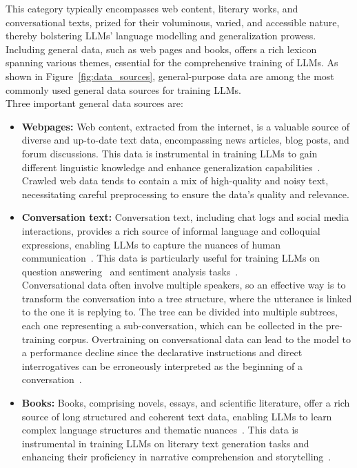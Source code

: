 This category typically encompasses web content, literary works, and conversational texts, prized for their voluminous, varied, and accessible nature, thereby bolstering LLMs' language modelling and generalization prowess.
Including general data, such as web pages and books, offers a rich lexicon spanning various themes, essential for the comprehensive training of LLMs.
As shown in Figure~\ref{fig:data_sources}, general-purpose data are among the most commonly used general data sources for training LLMs.\\
Three important general data sources are:
\begin{itemize}
	\item \textbf{Webpages:} {Web content, extracted from the internet, is a valuable source of diverse and up-to-date text data, encompassing news articles, blog posts, and forum discussions. This data is instrumental in training LLMs to gain different linguistic knowledge and enhance generalization capabilities~\cite{brown2020language, raffel2023exploring}.
		      Crawled web data tends to contain a mix of high-quality and noisy text, necessitating careful preprocessing to ensure the data's quality and relevance.
	      }
	\item \textbf{Conversation text:} {
		      Conversation text, including chat logs and social media interactions, provides a rich source of informal language and colloquial expressions, enabling LLMs to capture the nuances of human communication~\cite{zhang2022opt}. This data is particularly useful for training LLMs on question answering~\cite{chowdhery2022palm} and sentiment analysis tasks~\cite{zellers2019defending}.\\
		      Conversational data often involve multiple speakers, so an effective way is to transform the conversation into a tree structure, where the utterance is linked to the one it is replying to. The tree can be divided into multiple subtrees, each one representing a sub-conversation, which can be collected in the pre-training corpus.
		      Overtraining on conversational data can lead to the model to a performance decline since the declarative instructions and direct interrogatives can be erroneously interpreted as the beginning of a conversation~\cite{zhang2022opt}.
	      }
	\item \textbf{Books:} {
		      Books, comprising novels, essays, and scientific literature, offer a rich source of long structured and coherent text data, enabling LLMs to learn complex language structures and thematic nuances~\cite{zhu2015aligning}. This data is instrumental in training LLMs on literary text generation tasks and enhancing their proficiency in narrative comprehension and storytelling~\cite{radford2019language}.
	      }
\end{itemize}

